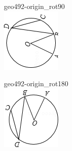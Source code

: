 \documentclass[12pt]{article}
\begin{document}
\begin{center}
\begin{minipage}{0.32\textwidth}
\end{minipage}
\hfill\begin{minipage}{0.32\textwidth}\centering
geo492-origin\_rot90\\
\includegraphics[width=0.95\linewidth]{out_rommath_origin/items/geo492-origin/assets/figure_rot90.png}
\end{minipage}
\par\medskip
\begin{minipage}{0.32\textwidth}\centering
geo492-origin\_rot180\\
\includegraphics[width=0.95\linewidth]{out_rommath_origin/items/geo492-origin/assets/figure_rot180.png}

\end{minipage}
\end{center}
\end{document}
